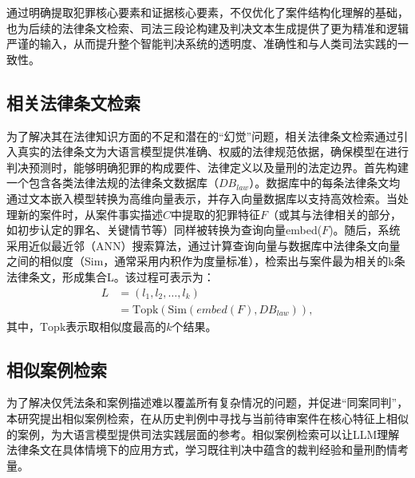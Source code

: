 通过明确提取犯罪核心要素和证据核心要素，不仅优化了案件结构化理解的基础，也为后续的法律条文检索、司法三段论构建及判决文本生成提供了更为精准和逻辑严谨的输入，从而提升整个智能判决系统的透明度、准确性和与人类司法实践的一致性。
\subsection{\heiti 相关法律条文检索}
为了解决其在法律知识方面的不足和潜在的“幻觉”问题，相关法律条文检索通过引入真实的法律条文为大语言模型提供准确、权威的法律规范依据，确保模型在进行判决预测时，能够明确犯罪的构成要件、法律定义以及量刑的法定边界。首先构建一个包含各类法律法规的法律条文数据库（$DB_{law}$​）。数据库中的每条法律条文均通过文本嵌入模型转换为高维向量表示，并存入向量数据库以支持高效检索。当处理新的案件时，从案件事实描述$C$中提取的犯罪特征$F$（或其与法律相关的部分，如初步认定的罪名、关键情节等）同样被转换为查询向量embed($F$)。随后，系统采用近似最近邻（ANN）搜索算法，通过计算查询向量与数据库中法律条文向量之间的相似度（Sim，通常采用内积作为度量标准），检索出与案件最为相关的k条法律条文，形成集合L。该过程可表示为：
\begin{equation}
	\begin{aligned}
		L & =(l_1​,l_2​,\dots,l_k​)                       \\
		  & =\text{Topk}​(\text{Sim}(embed(F),DB_{law})),
	\end{aligned}
\end{equation}
其中，$\text{Topk}​$表示取相似度最高的$k$个结果。
\subsection{\heiti 相似案例检索}
为了解决仅凭法条和案例描述难以覆盖所有复杂情况的问题，并促进“同案同判”， 本研究提出相似案例检索，在从历史判例中寻找与当前待审案件在核心特征上相似的案例，为大语言模型提供司法实践层面的参考。相似案例检索可以让LLM理解法律条文在具体情境下的应用方式，学习既往判决中蕴含的裁判经验和量刑酌情考量。

